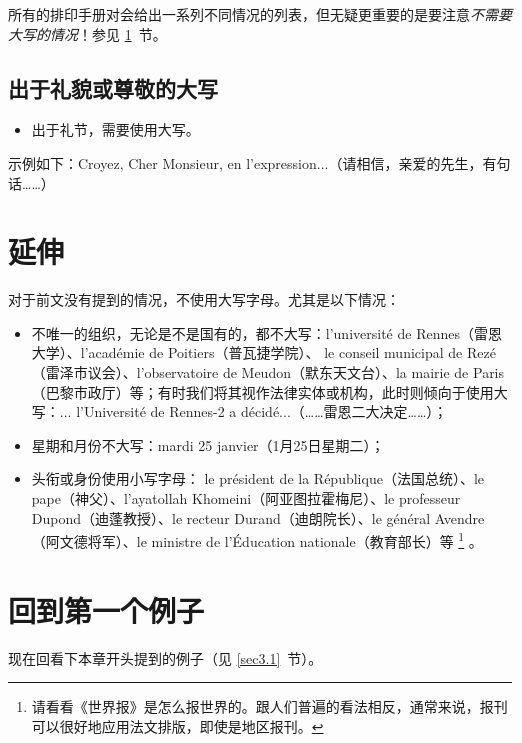 所有的排印手册对会给出一系列不同情况的列表，但无疑更重要的是要注意\emph{不需要大写的情况}！参见 \ref{sec3.5}~节。

\subsection{出于礼貌或尊敬的大写}

\begin{itemize}
    \item 出于礼节，需要使用大写。
\end{itemize}

示例如下：Croyez, Cher Monsieur, en l'expression...（请相信，亲爱的先生，有句话……）

\section{延伸}\label{sec3.5}

对于前文没有提到的情况，不使用大写字母。尤其是以下情况：

\begin{itemize}
    \item 不唯一的组织，无论是不是国有的，都不大写：l'université de Rennes（雷恩大学）、l'académie de Poitiers（普瓦捷学院）、 le conseil municipal de Rezé（雷泽市议会）、l'observatoire de Meudon（默东天文台）、la mairie de Paris（巴黎市政厅）等；有时我们将其视作法律实体或机构，此时则倾向于使用大写：... l'Université de Rennes-2 a décidé...（……雷恩二大决定……）；
    \item 星期和月份不大写：mardi 25 janvier（1月25日星期二）；
    \item 头衔或身份使用小写字母： le président de la République（法国总统）、le pape（神父）、l'ayatollah Khomeini（阿亚图拉霍梅尼）、le professeur Dupond（迪蓬教授）、le recteur Durand（迪朗院长）、le général Avendre（阿文德将军）、le ministre de l'Éducation nationale（教育部长）等
        \footnote{请看看《世界报》是怎么报世界的。跟人们普遍的看法相反，通常来说，报刊可以很好地应用法文排版，即使是地区报刊。}
    。
\end{itemize}

\section{回到第一个例子}\label{sec3.6}

现在回看下本章开头提到的例子（见 \ref{sec3.1}~节）。

